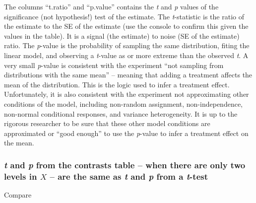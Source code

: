 \documentclass[]{book}
\newenvironment{Shaded}{\begin{snugshade}}{\end{snugshade}}
\newcommand{\DataTypeTok}[1]{\textcolor[rgb]{0.13,0.29,0.53}{#1}}
\newcommand{\KeywordTok}[1]{\textcolor[rgb]{0.13,0.29,0.53}{\textbf{#1}}}
\newcommand{\NormalTok}[1]{#1}
\newcommand{\OperatorTok}[1]{\textcolor[rgb]{0.81,0.36,0.00}{\textbf{#1}}}
\newcommand{\OtherTok}[1]{\textcolor[rgb]{0.56,0.35,0.01}{#1}}
\newcommand{\StringTok}[1]{\textcolor[rgb]{0.31,0.60,0.02}{#1}}
\begin{document}
The columns ``t.ratio'' and ``p.value'' contains the \emph{t} and \emph{p} values of the significance (not hypothesis!) test of the estimate. The \emph{t}-statistic is the ratio of the estimate to the SE of the estimate (use the console to confirm this given the values in the table). It is a signal (the estimate) to noise (SE of the estimate) ratio. The \emph{p}-value is the probability of sampling the same distribution, fiting the linear model, and observing a \emph{t}-value as or more extreme than the observed \emph{t}. A very small \emph{p}-value is consistent with the experiment ``not sampling from distributions with the same mean'' -- meaning that adding a treatment affects the mean of the distribution. This is the logic used to infer a treatment effect. Unfortunately, it is also consistent with the experiment not approximating other conditions of the model, including non-random assignment, non-independence, non-normal conditional responses, and variance heterogeneity. It is up to the rigorous researcher to be sure that these other model conditions are approximated or ``good enough'' to use the \emph{p}-value to infer a treatment effect on the mean.

\hypertarget{t-and-p-from-the-contrasts-table-when-there-are-only-two-levels-in-x-are-the-same-as-t-and-p-from-a-t-test}{%
\subsubsection{\texorpdfstring{\emph{t} and \emph{p} from the contrasts table -- when there are only two levels in \(X\) -- are the same as \emph{t} and \emph{p} from a \emph{t}-test}{t and p from the contrasts table -- when there are only two levels in X -- are the same as t and p from a t-test}}\label{t-and-p-from-the-contrasts-table-when-there-are-only-two-levels-in-x-are-the-same-as-t-and-p-from-a-t-test}}

Compare

\begin{Shaded}
\end{Shaded}
\end{document}
